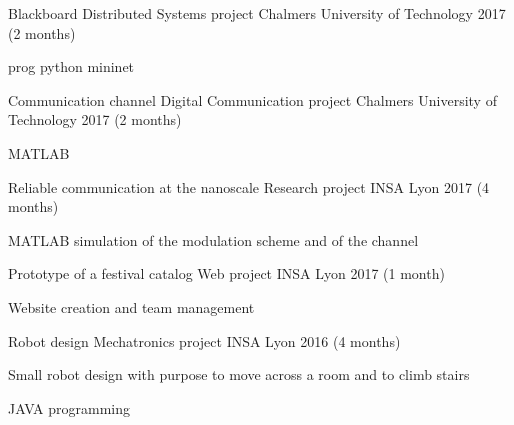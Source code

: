 

\begin{cventries}

  \cventry
    {Blackboard } %
    {Distributed Systems project} %
    {Chalmers University of Technology} %
    {2017 (2 months)} %
    {
      \begin{cvitems} %
        \item {prog python mininet}
      \end{cvitems}
    }

  \cventry
    {Communication channel} %
    {Digital Communication project} %
    {Chalmers University of Technology} %
    {2017 (2 months)} %
    {
      \begin{cvitems} %
        \item {MATLAB}
      \end{cvitems}
    }

  \cventry
    {Reliable communication at the nanoscale} %
    {Research project} %
    {INSA Lyon} %
    {2017 (4 months)} %
    {
      \begin{cvitems} %
        \item {MATLAB simulation of the modulation scheme and of the channel}
      \end{cvitems}
    }

  \cventry
    {Prototype of a festival catalog} %
    {Web project} %
    {INSA Lyon} %
    {2017 (1 month)} %
    {
      \begin{cvitems} %
        \item {Website creation and team management}
      \end{cvitems}
    }

  \cventry
    {Robot design} %
    {Mechatronics project} %
    {INSA Lyon} %
    {2016 (4 months)} %
    {
      \begin{cvitems} %
        \item {Small robot design with purpose to move across a room and to climb stairs}
        \item {JAVA programming}
      \end{cvitems}
    }


\end{cventries}
